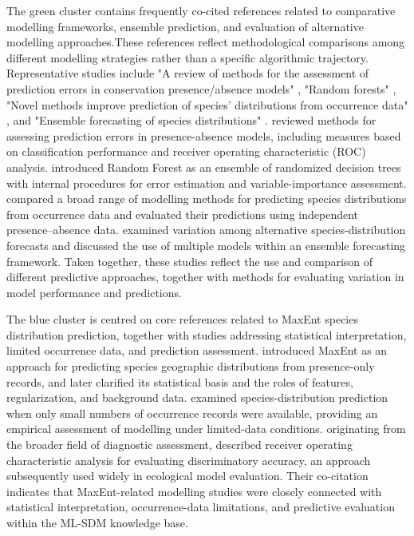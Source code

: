 \documentclass[authoryear,preprint,review,12pt]{elsarticle}
\begin{document}
The green cluster contains frequently co-cited references related to comparative modelling frameworks, ensemble prediction, and evaluation of alternative modelling approaches.These references reflect methodological comparisons among different modelling strategies rather than a specific algorithmic trajectory.  Representative studies include "A review of methods for the assessment of prediction errors in conservation presence/absence models" \citep{fielding1997review}, "Random forests" \citep{breiman2001random}, "Novel methods improve prediction of species' distributions from occurrence data" \citep{elith2006novel}, and "Ensemble forecasting of species distributions" \citep{araujo2007ensemble}. \cite{fielding1997review} reviewed methods for assessing prediction errors in presence-absence models, including measures based on classification performance and receiver operating characteristic (ROC) analysis. \cite{breiman2001random} introduced Random Forest as an ensemble of randomized decision trees with internal procedures for error estimation and variable-importance assessment. \cite{elith2006novel} compared a broad range of modelling methods for predicting species distributions from occurrence data and evaluated their predictions using independent presence--absence data. \cite{araujo2007ensemble} examined variation among alternative species-distribution forecasts and discussed the use of multiple models within an ensemble forecasting framework. Taken together, these studies reflect the use and comparison of different predictive approaches, together with methods for evaluating variation in model performance and predictions.

The blue cluster is centred on core references related to MaxEnt species distribution prediction, together with studies addressing statistical interpretation, limited occurrence data, and prediction assessment. \cite{phillips2006maximum} introduced MaxEnt as an approach for predicting species geographic distributions from presence-only records, and \cite{elith2011statistical} later clarified its statistical basis and the roles of features, regularization, and background data. \cite{pearson2007predicting} examined species-distribution prediction when only small numbers of occurrence records were available, providing an empirical assessment of modelling under limited-data conditions. \cite{swets1988measuring} originating from the broader field of diagnostic assessment, described receiver operating characteristic analysis for evaluating discriminatory accuracy, an approach subsequently used widely in ecological model evaluation. Their co-citation indicates that MaxEnt-related modelling studies were closely connected with statistical interpretation, occurrence-data limitations, and predictive evaluation within the ML-SDM knowledge base.
\end{document}
